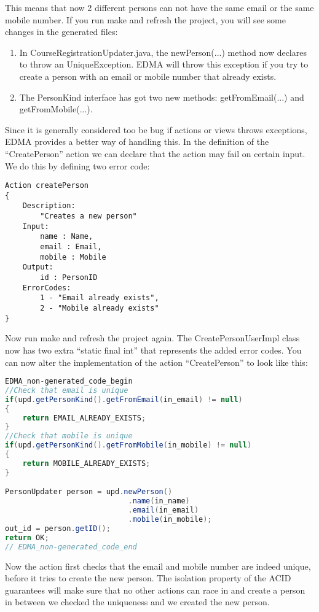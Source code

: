 This means that now 2 different persons can not have the same email
or the same mobile number. If you run make and refresh the project,
you will see some changes in the generated files:
\begin{enumerate}
\item In CourseRegistrationUpdater.java, the newPerson(...) method now declares
to throw an UniqueException. EDMA will throw this exception if you
try to create a person with an email or mobile number that already
exists.
\item The PersonKind interface has got two new methods: getFromEmail(...)
and getFromMobile(...).
\end{enumerate}
Since it is generally considered too be bug if actions or views throws
exceptions, EDMA provides a better way of handling this. In the definition
of the ``CreatePerson'' action we can declare that the action may
fail on certain input. We do this by defining two error code:

\begin{lstlisting}[basicstyle={\scriptsize}]
Action createPerson
{
	Description:
		"Creates a new person"
	Input: 
		name : Name,
		email : Email,
		mobile : Mobile
	Output:
		id : PersonID
	ErrorCodes:
		1 - "Email already exists",
		2 - "Mobile already exists"
}
\end{lstlisting}


Now run make and refresh the project again. The CreatePersonUserImpl
class now has two extra ``static final int'' that represents the
added error codes. You can now alter the implementation of the action
``CreatePerson'' to look like this:

\begin{lstlisting}[basicstyle={\scriptsize},language=Java,tabsize=2]
EDMA_non-generated_code_begin
//Check that email is unique
if(upd.getPersonKind().getFromEmail(in_email) != null)
{
	return EMAIL_ALREADY_EXISTS;
}
//Check that mobile is unique
if(upd.getPersonKind().getFromMobile(in_mobile) != null)
{
	return MOBILE_ALREADY_EXISTS;
}

PersonUpdater person = upd.newPerson()
							.name(in_name)
							.email(in_email)
							.mobile(in_mobile);
out_id = person.getID();
return OK;
// EDMA_non-generated_code_end
\end{lstlisting}


Now the action first checks that the email and mobile number are indeed
unique, before it tries to create the new person. The isolation property
of the ACID guarantees will make sure that no other actions can race
in and create a person in between we checked the uniqueness and we
created the new person.

